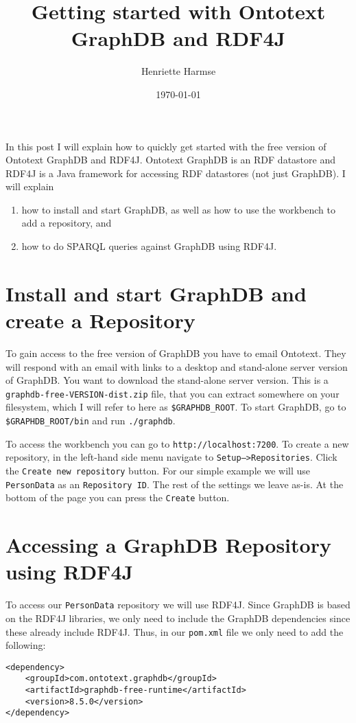 \documentclass{amsart}
\title{Getting started with Ontotext GraphDB and RDF4J}
\author{Henriette Harmse}
\date{\today}
\begin{document}
  \maketitle
  In this post I will explain how to quickly get started with the free version of Ontotext GraphDB and RDF4J. Ontotext GraphDB is an RDF datastore and RDF4J is a Java framework for accessing RDF datastores (not just GraphDB).
  I will explain 
  \begin{enumerate}
   \item how to install and start GraphDB, as well as how to use the workbench to add a repository, and
   \item how to do SPARQL queries against GraphDB using RDF4J.
  \end{enumerate}

  \section{Install and start GraphDB and create a Repository}
  To gain access  to the free version of GraphDB you have to email Ontotext. They will respond with an email with links to a desktop and stand-alone server version of GraphDB. You want to download the stand-alone server version. This is a \texttt{graphdb-free-VERSION-dist.zip} file, that you can extract somewhere on your filesystem, which I will refer to here as \texttt{\$GRAPHDB\_ROOT}. To start GraphDB, go to  \texttt{\$GRAPHDB\_ROOT/bin} and run \texttt{./graphdb}.
  
  To access the workbench you can go to \texttt{http://localhost:7200}. To create a new repository, in the left-hand side menu navigate to \texttt{Setup-->Repositories}.  Click the \texttt{Create new repository} button. For our simple example we will use \texttt{PersonData} as an \texttt{Repository ID}. The rest of the settings we leave as-is. At the bottom of the page you can press the \texttt{Create} button.
  
    
  \section{Accessing a GraphDB Repository using RDF4J}
  To access our \texttt{PersonData} repository we will use RDF4J.  Since GraphDB is based on the RDF4J libraries, we only need to include the GraphDB dependencies since these already include RDF4J. Thus, in our \texttt{pom.xml} file we only need to add the following:

\begin{small}
\begin{verbatim} 
<dependency>
    <groupId>com.ontotext.graphdb</groupId>
    <artifactId>graphdb-free-runtime</artifactId>
    <version>8.5.0</version>
</dependency>
\end{verbatim}
\end{small}
\end{document}
